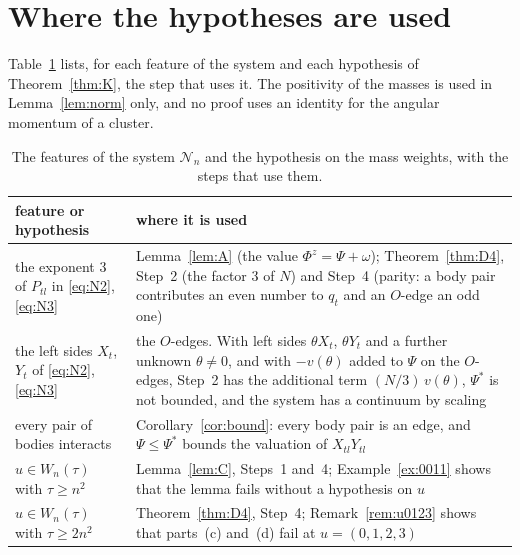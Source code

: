\documentclass[11pt]{amsart}
\theoremstyle{definition}
\theoremstyle{remark}
\numberwithin{equation}{section}
\newcommand{\cN}{\mathcal{N}}
\newcommand{\Ps}{\Psi^{*}}
\begin{document}
\section{Where the hypotheses are used}\label{sec:hyp}

Table~\ref{tab:hyp} lists, for each feature of the system and each hypothesis of Theorem~\ref{thm:K}, the
step that uses it. The positivity of the masses is used in Lemma~\ref{lem:norm} only, and no proof uses an identity for the
angular momentum of a cluster.

\begin{table}[ht]
\caption{The features of the system $\cN_n$ and the hypothesis on the mass weights, with the steps that
use them.}\label{tab:hyp}
\small
\begin{tabular}{@{}>{\raggedright}p{}>{\raggedright\arraybackslash}p{}@{}}
\toprule
feature or hypothesis & where it is used \\
\midrule
the exponent $3$ of $P_{tl}$ in \eqref{eq:N2}, \eqref{eq:N3} & Lemma~\ref{lem:A} (the value $\Phi^z = \Psi + \omega$); Theorem~\ref{thm:D4}, Step~2 (the factor $3$ of $N$) and Step~4 (parity: a body pair contributes an even number to $q_t$ and an $O$-edge an odd one) \\
the left sides $X_t$, $Y_t$ of \eqref{eq:N2}, \eqref{eq:N3} & the $O$-edges. With left sides $\theta X_t$, $\theta Y_t$ and a further unknown $\theta \ne 0$, and with $-v(\theta)$ added to $\Psi$ on the $O$-edges, Step~2 has the additional term $(N/3)\, v(\theta)$, $\Ps$ is not bounded, and the system has a continuum by scaling \\
every pair of bodies interacts & Corollary~\ref{cor:bound}: every body pair is an edge, and $\Psi \le \Ps$ bounds the valuation of $X_{tl} Y_{tl}$ \\
$u \in W_n(\tau)$ with $\tau \ge n^2$ & Lemma~\ref{lem:C}, Steps~1 and~4; Example~\ref{ex:0011} shows that the lemma fails without a hypothesis on $u$ \\
$u \in W_n(\tau)$ with $\tau \ge 2n^2$ & Theorem~\ref{thm:D4}, Step~4; Remark~\ref{rem:u0123} shows that parts~(c) and~(d) fail at $u = (0, 1, 2, 3)$ \\
\bottomrule
\end{tabular}
\end{table}
\end{document}
